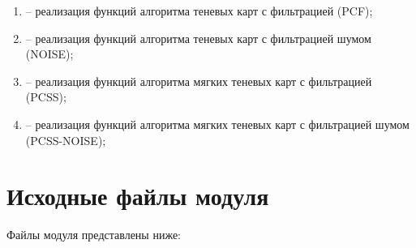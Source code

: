 \begin{itemize}[label=---]
\begin{enumerate}[label=\arabic*), labelsep=0.5em]
        \item {} -- реализация функций алгоритма теневых карт с фильтрацией (PCF);
        \item {} -- реализация функций алгоритма теневых карт с фильтрацией шумом (NOISE);
        \item {} -- реализация функций алгоритма мягких теневых карт с фильтрацией (PCSS);
        \item {} -- реализация функций алгоритма мягких теневых карт с фильтрацией шумом (PCSS-NOISE);
    \end{enumerate}
\end{itemize}

\section{Исходные файлы модуля }

Файлы модуля представлены ниже:

